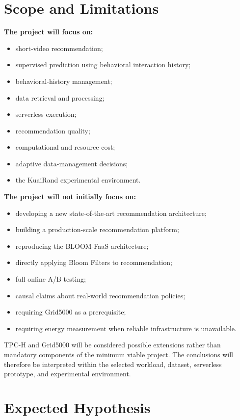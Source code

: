 \documentclass[12pt,a4paper]{article}
\begin{document}
\section{Scope and Limitations}

\textbf{The project will focus on:}
\begin{itemize}
    \item short-video recommendation;
    \item supervised prediction using behavioral interaction history;
    \item behavioral-history management;
    \item data retrieval and processing;
    \item serverless execution;
    \item recommendation quality;
    \item computational and resource cost;
    \item adaptive data-management decisions;
    \item the KuaiRand experimental environment.
\end{itemize}

\textbf{The project will not initially focus on:}
\begin{itemize}
    \item developing a new state-of-the-art recommendation architecture;
    \item building a production-scale recommendation platform;
    \item reproducing the BLOOM-FaaS architecture;
    \item directly applying Bloom Filters to recommendation;
    \item full online A/B testing;
    \item causal claims about real-world recommendation policies;
    \item requiring Grid5000 as a prerequisite;
    \item requiring energy measurement when reliable infrastructure is unavailable.
\end{itemize}

TPC-H and Grid5000 will be considered possible extensions rather than mandatory components of the minimum viable project. The conclusions will therefore be interpreted within the selected workload, dataset, serverless prototype, and experimental environment.

\section{Expected Hypothesis}
\end{document}
